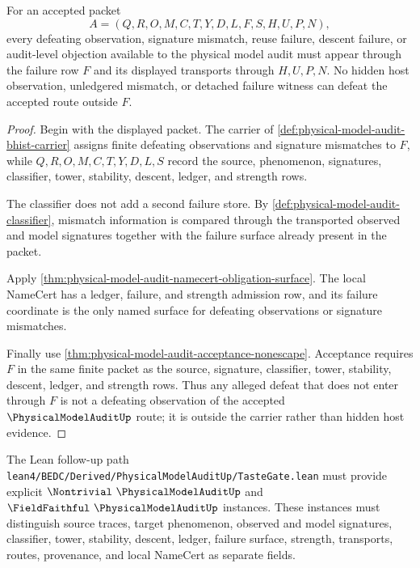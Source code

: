 \begin{theorem}
\label{thm:physical-model-audit-failure-surface-exhaustion}
For an accepted packet
$$
A=(Q,R,O,M,C,T,Y,D,L,F,S,H,U,P,N),
$$
every defeating observation, signature mismatch, reuse failure, descent failure, or audit-level objection available to the physical model audit must appear through the failure row $F$ and its displayed transports through $H,U,P,N$. No hidden host observation, unledgered mismatch, or detached failure witness can defeat the accepted route outside $F$.
\end{theorem}
\begin{proof}
Begin with the displayed packet. The carrier of \autoref{def:physical-model-audit-bhist-carrier} assigns finite defeating observations and signature mismatches to $F$, while $Q,R,O,M,C,T,Y,D,L,S$ record the source, phenomenon, signatures, classifier, tower, stability, descent, ledger, and strength rows.

The classifier does not add a second failure store. By \autoref{def:physical-model-audit-classifier}, mismatch information is compared through the transported observed and model signatures together with the failure surface already present in the packet.

Apply \autoref{thm:physical-model-audit-namecert-obligation-surface}. The local NameCert has a ledger, failure, and strength admission row, and its failure coordinate is the only named surface for defeating observations or signature mismatches.

Finally use \autoref{thm:physical-model-audit-acceptance-nonescape}. Acceptance requires $F$ in the same finite packet as the source, signature, classifier, tower, stability, descent, ledger, and strength rows. Thus any alleged defeat that does not enter through $F$ is not a defeating observation of the accepted $\PhysicalModelAuditUp$ route; it is outside the carrier rather than hidden host evidence.
\end{proof}

The Lean follow-up path \texttt{lean4/BEDC/Derived/PhysicalModelAuditUp/TasteGate.lean} must provide explicit $\Nontrivial\ \PhysicalModelAuditUp$ and $\FieldFaithful\ \PhysicalModelAuditUp$ instances. These instances must distinguish source traces, target phenomenon, observed and model signatures, classifier, tower, stability, descent, ledger, failure surface, strength, transports, routes, provenance, and local NameCert as separate fields.

